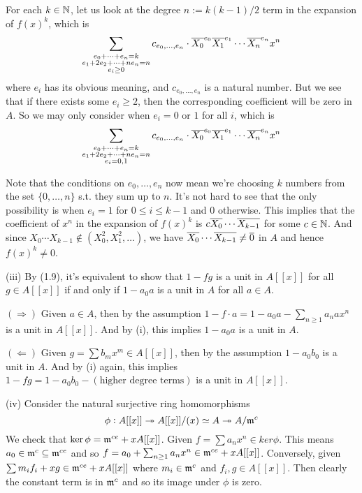 \documentclass[../A&M.tex]{subfiles}
\begin{document}
For each $k\in\mathbb{N}$, let us look at the degree $n:=k(k-1)/2$ term in the expansion of $f(x)^k$, which is
$$
\sum_{\substack{ e_0+\cdots+e_n = k \\ e_1+2e_2+\cdots+ne_n = n \\ e_i\geq0 }} c_{e_0,\ldots,e_n} \cdot \overline{X_0}^{e_0} \overline{X_1}^{e_1} \cdots \overline{X_n}^{e_n} x^n
$$
where $e_i$ has its obvious meaning, and $c_{e_0,\ldots,e_n}$ is a natural number. But we see that if there exists some $e_i\geq 2$, then the corresponding coefficient will be zero in $A$. So we may only consider when $e_i=0$ or $1$ for all $i$, which is
$$
\sum_{\substack{ e_0+\cdots+e_n = k \\ e_1+2e_2+\cdots+ne_n = n \\ e_i=0,1 }} c_{e_0,\ldots,e_n} \cdot \overline{X_0}^{e_0} \overline{X_1}^{e_1} \cdots \overline{X_n}^{e_n} x^n
$$

Note that the conditions on $e_0,\ldots,e_n$ now mean we're choosing $k$ numbers from the set $\{0,\ldots,n\}$ s.t. they sum up to $n$. It's not hard to see that the only possibility is when $e_i=1$ for $0 \leq i \leq k-1$ and $0$ otherwise. This implies that the coefficient of $x^n$ in the expansion of $f(x)^k$ is $c\overline{X_0}\cdots\overline{X_{k-1}}$ for some $c\in\mathbb{N}$. And since $X_0\cdots X_{k-1} \not\in (X_0^2,X_1^2,\ldots)$, we have $\overline{X_0}\cdots\overline{X_{k-1}} \neq \overline{0}$ in $A$ and hence $f(x)^k\neq0$.

(iii) By (1.9), it's equivalent to show that $1-fg$ is a unit in $A[[x]]$ for all $g\in A[[x]]$ if and only if $1-a_0a$ is a unit in $A$ for all $a\in A$.

$(\Rightarrow)$ Given $a\in A$, then by the assumption $1-f\cdot a = 1 - a_0a - \sum_{n\geq1} a_nax^n$ is a unit in $A[[x]]$. And by (i), this implies $1-a_0a$ is a unit in $A$.

$(\Leftarrow)$ Given $g=\sum b_mx^m \in A[[x]]$, then by the assumption $1-a_0b_0$ is a unit in $A$. And by (i) again, this implies $1-fg = 1-a_0b_0 - (\text{higher degree terms})$ is a unit in $A[[x]]$.

(iv) Consider the natural surjective ring homomorphisms
$$
\phi: A[[x]] \twoheadrightarrow A[[x]]/(x) \simeq A \twoheadrightarrow A/\mathfrak{m}^c
$$
We check that $\ker\phi = \mathfrak{m}^{ce} + xA[[x]]$. Given $f=\sum a_nx^n \in ker\phi$. This means $a_0 \in \mathfrak{m}^c \subseteq \mathfrak{m}^{ce}$ and so $f = a_0 + \sum_{n\geq1} a_nx^n \in \mathfrak{m}^{ce} + xA[[x]]$. Conversely, given $\sum m_if_i + xg \in \mathfrak{m}^{ce} + xA[[x]]$ where $m_i\in\mathfrak{m}^c$ and $f_i,g \in A[[x]]$. Then clearly the constant term is in $\mathfrak{m}^c$ and so its image under $\phi$ is zero.
\end{document}
